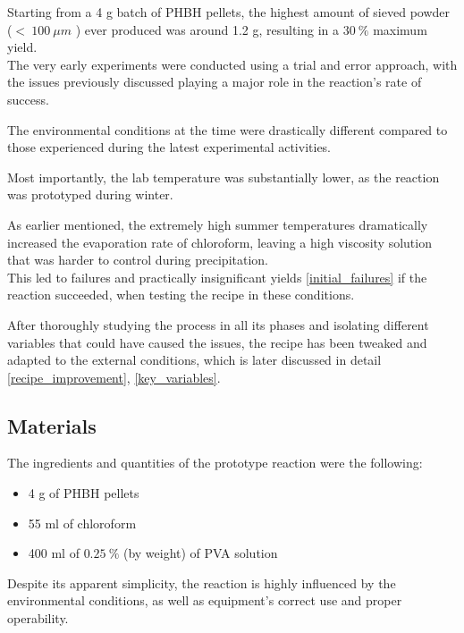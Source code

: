 \documentclass{article}
\begin{document}
    Starting from a 4 g batch of PHBH pellets, the highest amount of sieved powder ($ < \ 100 \ \mu m$ )
    ever produced was around 1.2 g, resulting in a $30 \ \% $ maximum yield. \\ 

    The very early experiments were conducted using a trial and error approach, with the issues previously discussed 
    playing a major role in the reaction's rate of success. 
    
    The environmental conditions at the time were drastically different compared to those experienced during the latest experimental 
    activities. 

    Most importantly, the lab temperature was substantially lower, as the reaction was prototyped during winter. 
    
    As earlier mentioned, the extremely high summer temperatures dramatically increased the evaporation rate of 
    chloroform, leaving a high viscosity solution that was harder to control during precipitation. \\

    This led to failures and practically insignificant yields \ref{initial_failures} if 
    the reaction succeeded, when testing the recipe in these conditions.  

    After thoroughly studying the process in all its phases and isolating different variables that could have caused the issues, 
    the recipe has been tweaked and adapted to the external conditions, which is later discussed 
    in detail \ref{recipe_improvement}, \ref{key_variables}. 

        \subsection{Materials\label{Components}}

        The ingredients and quantities of the prototype reaction were the following: 

            \begin{itemize}
                \item 4 g of PHBH pellets 
                \item 55 ml of chloroform 
                \item 400 ml of $0.25 \ \% $ (by weight) of PVA solution 
            \end{itemize} 
        

        Despite its apparent simplicity, the reaction is highly influenced by the environmental conditions, as well as
        equipment's correct use and proper operability. \\ 
        
\end{document}
